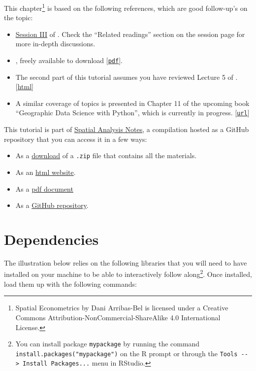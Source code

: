 \documentclass[
]{book}
\providecommand{\tightlist}{%
  \setlength{\itemsep}{0pt}\setlength{\parskip}{0pt}}
\begin{document}
This chapter\footnote{{Spatial Econometrics} by Dani Arribas-Bel is licensed under a Creative Commons Attribution-NonCommercial-ShareAlike 4.0 International License.} is based on the following references, which are good follow-up's on the topic:

\begin{itemize}
\tightlist
\item
  \href{http://darribas.org/sdar_mini/notes/Class_03.html}{Session III} of \citet{arribas2014spatial}. Check the ``Related readings'' section on the session page for more in-depth discussions.
\item
  \citet{anselin2005spatial}, freely available to download {[}\href{http://csiss.org/GISPopSci/workshops/2011/PSU/readings/W15_Anselin2007.pdf}{\texttt{pdf}}{]}.
\item
  The second part of this tutorial assumes you have reviewed Lecture 5 of \citet{darribas_gds19}. {[}\href{http://darribas.org/gds19/notes/Class_05.html}{html}{]}
\item
  A similar coverage of topics is presented in Chapter 11 of the upcoming book ``Geographic Data Science with Python'', which is currently in progress. {[}\href{https://geographicdata.science/book/notebooks/11_regression.html}{\texttt{url}}{]}
\end{itemize}

This tutorial is part of \href{index.html}{Spatial Analysis Notes}, a compilation hosted as a GitHub repository that you can access it in a few ways:

\begin{itemize}
\tightlist
\item
  As a \href{https://github.com/GDSL-UL/san/archive/master.zip}{download} of a \texttt{.zip} file that contains all the materials.
\item
  As an \href{https://gdsl-ul.github.io/san/spatial-econometrics.html}{html
  website}.
\item
  As a \href{https://gdsl-ul.github.io/san/spatial_analysis_notes.pdf}{pdf
  document}
\item
  As a \href{https://github.com/GDSL-UL/san}{GitHub repository}.
\end{itemize}

\hypertarget{dependencies-3}{%
\section{Dependencies}\label{dependencies-3}}

The illustration below relies on the following libraries that you will need to have installed on your machine to be able to interactively follow along\footnote{You can install package \texttt{mypackage} by running the command \texttt{install.packages("mypackage")} on the R prompt or through the \texttt{Tools\ -\/-\textgreater{}\ Install\ Packages...} menu in RStudio.}. Once installed, load them up with the following commands:
\end{document}
